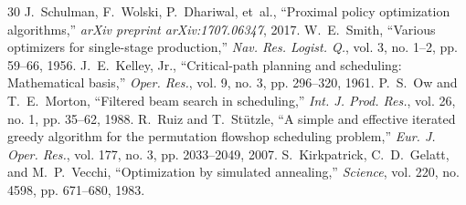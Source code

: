 \documentclass[journal,10pt]{IEEEtran}
\begin{document}
\begin{thebibliography}{30}
J.~Schulman, F.~Wolski, P.~Dhariwal, et~al., ``Proximal policy optimization algorithms,'' \textit{arXiv preprint arXiv:1707.06347}, 2017.
W.~E.~Smith, ``Various optimizers for single-stage production,'' \textit{Nav. Res. Logist. Q.}, vol. 3, no. 1--2, pp. 59--66, 1956.
J.~E.~Kelley, Jr., ``Critical-path planning and scheduling: Mathematical basis,'' \textit{Oper. Res.}, vol. 9, no. 3, pp. 296--320, 1961.
P.~S.~Ow and T.~E.~Morton, ``Filtered beam search in scheduling,'' \textit{Int. J. Prod. Res.}, vol. 26, no. 1, pp. 35--62, 1988.
R.~Ruiz and T.~St\"utzle, ``A simple and effective iterated greedy algorithm for the permutation flowshop scheduling problem,'' \textit{Eur. J. Oper. Res.}, vol. 177, no. 3, pp. 2033--2049, 2007.
S.~Kirkpatrick, C.~D.~Gelatt, and M.~P.~Vecchi, ``Optimization by simulated annealing,'' \textit{Science}, vol. 220, no. 4598, pp. 671--680, 1983.
\end{thebibliography}
\end{document}
